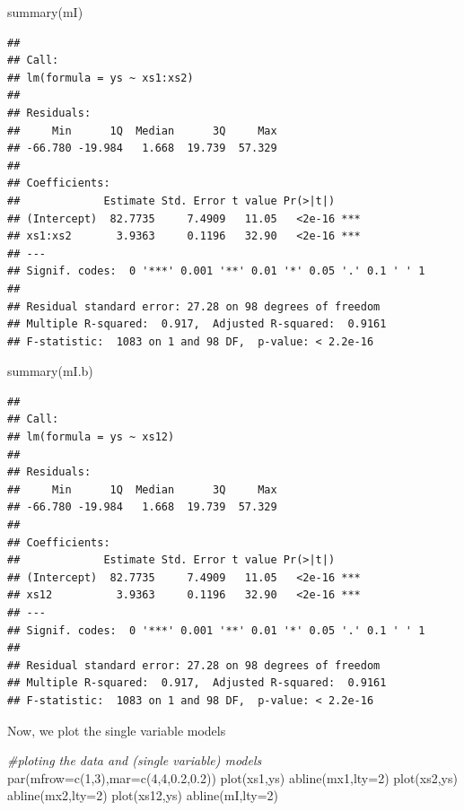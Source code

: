 \documentclass[
]{book}
\newenvironment{Shaded}{\begin{snugshade}}{\end{snugshade}}
\newcommand{\AttributeTok}[1]{\textcolor[rgb]{0.77,0.63,0.00}{#1}}
\newcommand{\CommentTok}[1]{\textcolor[rgb]{0.56,0.35,0.01}{\textit{#1}}}
\newcommand{\DecValTok}[1]{\textcolor[rgb]{0.00,0.00,0.81}{#1}}
\newcommand{\FloatTok}[1]{\textcolor[rgb]{0.00,0.00,0.81}{#1}}
\newcommand{\FunctionTok}[1]{\textcolor[rgb]{0.00,0.00,0.00}{#1}}
\newcommand{\NormalTok}[1]{#1}
\begin{document}
\begin{Shaded}
\begin{Highlighting}[]
\FunctionTok{summary}\NormalTok{(mI)}
\end{Highlighting}
\end{Shaded}

\begin{verbatim}
## 
## Call:
## lm(formula = ys ~ xs1:xs2)
## 
## Residuals:
##     Min      1Q  Median      3Q     Max 
## -66.780 -19.984   1.668  19.739  57.329 
## 
## Coefficients:
##             Estimate Std. Error t value Pr(>|t|)    
## (Intercept)  82.7735     7.4909   11.05   <2e-16 ***
## xs1:xs2       3.9363     0.1196   32.90   <2e-16 ***
## ---
## Signif. codes:  0 '***' 0.001 '**' 0.01 '*' 0.05 '.' 0.1 ' ' 1
## 
## Residual standard error: 27.28 on 98 degrees of freedom
## Multiple R-squared:  0.917,  Adjusted R-squared:  0.9161 
## F-statistic:  1083 on 1 and 98 DF,  p-value: < 2.2e-16
\end{verbatim}

\begin{Shaded}
\begin{Highlighting}[]
\FunctionTok{summary}\NormalTok{(mI.b)}
\end{Highlighting}
\end{Shaded}

\begin{verbatim}
## 
## Call:
## lm(formula = ys ~ xs12)
## 
## Residuals:
##     Min      1Q  Median      3Q     Max 
## -66.780 -19.984   1.668  19.739  57.329 
## 
## Coefficients:
##             Estimate Std. Error t value Pr(>|t|)    
## (Intercept)  82.7735     7.4909   11.05   <2e-16 ***
## xs12          3.9363     0.1196   32.90   <2e-16 ***
## ---
## Signif. codes:  0 '***' 0.001 '**' 0.01 '*' 0.05 '.' 0.1 ' ' 1
## 
## Residual standard error: 27.28 on 98 degrees of freedom
## Multiple R-squared:  0.917,  Adjusted R-squared:  0.9161 
## F-statistic:  1083 on 1 and 98 DF,  p-value: < 2.2e-16
\end{verbatim}

Now, we plot the single variable models

\begin{Shaded}
\begin{Highlighting}[]
\CommentTok{\#ploting the data and (single variable) models}
\FunctionTok{par}\NormalTok{(}\AttributeTok{mfrow=}\FunctionTok{c}\NormalTok{(}\DecValTok{1}\NormalTok{,}\DecValTok{3}\NormalTok{),}\AttributeTok{mar=}\FunctionTok{c}\NormalTok{(}\DecValTok{4}\NormalTok{,}\DecValTok{4}\NormalTok{,}\FloatTok{0.2}\NormalTok{,}\FloatTok{0.2}\NormalTok{))}
\FunctionTok{plot}\NormalTok{(xs1,ys)}
\FunctionTok{abline}\NormalTok{(mx1,}\AttributeTok{lty=}\DecValTok{2}\NormalTok{)}
\FunctionTok{plot}\NormalTok{(xs2,ys)}
\FunctionTok{abline}\NormalTok{(mx2,}\AttributeTok{lty=}\DecValTok{2}\NormalTok{)}
\FunctionTok{plot}\NormalTok{(xs12,ys)}
\FunctionTok{abline}\NormalTok{(mI,}\AttributeTok{lty=}\DecValTok{2}\NormalTok{)}
\end{Highlighting}
\end{Shaded}
\end{document}
